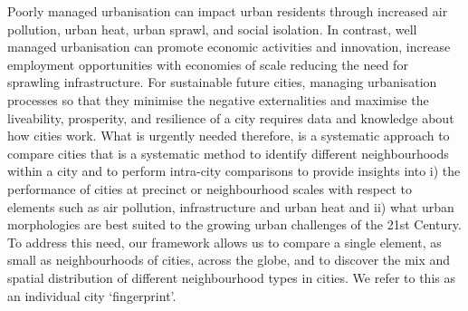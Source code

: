 \documentclass[9pt,twocolumn,twoside,lineno]{pnas-new}
\begin{document}
%
%
%
%
%
%
%
%








Poorly managed urbanisation can impact urban residents through increased air pollution\cite{Stevenson2016,Sallis2016,Landrigan2017}, urban heat\cite{Coutts2012,Bowler2010}, urban sprawl\cite{Frank2000,Bettencourt2010}, and social isolation\cite{Vlahov2002}. In contrast, well managed urbanisation can promote economic activities and innovation, increase employment opportunities with economies of scale reducing the need for sprawling infrastructure\cite{Kuhnert2006,Bettencourt2007,Lobo2013}. For sustainable future cities, managing urbanisation processes so that they minimise the negative externalities and maximise the liveability, prosperity, and resilience of a city requires data and knowledge about how cities work. What is urgently needed therefore, is a systematic approach to compare cities that is a systematic method to identify different neighbourhoods within a city and to perform intra-city comparisons\cite{Louf2014a} to provide insights into i) the performance of cities at precinct or neighbourhood scales with respect to elements such as air pollution, infrastructure and urban heat and ii) what urban morphologies are best suited to the growing urban challenges of the 21st Century. To address this need, our framework allows us to compare a single element, as small as neighbourhoods of cities, across the globe, and to discover the mix and spatial distribution of different neighbourhood types in cities. We refer to this as an individual city `fingerprint'.
\end{document}

